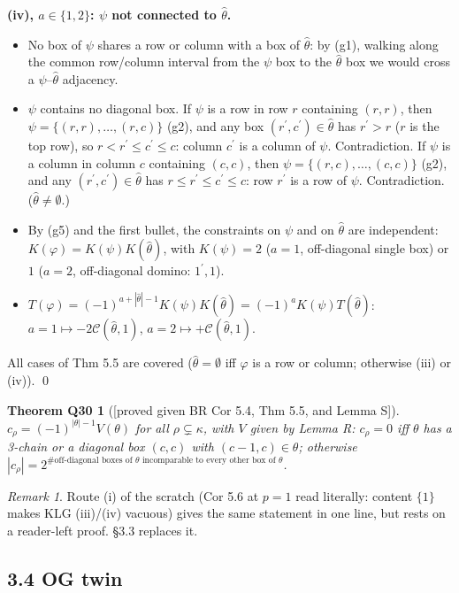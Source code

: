 \documentclass[10pt]{amsart}
\newcommand{\grade}[1]{\textsf{[#1]}}
\newcommand{\cC}{\mathcal{C}}
\newcommand{\pr}{^{\prime}}
\newtheorem*{thmQ}{Theorem Q30}
\theoremstyle{remark}
\newtheorem*{rem}{Remark}
\begin{document}
\textbf{(iv), $a\in\{1,2\}$: $\psi$ not connected to $\hat\theta$.}
\begin{itemize}
\item No box of $\psi$ shares a row or column with a box of $\hat\theta$: by (g1), walking along the common row/column
interval from the $\psi$ box to the $\hat\theta$ box we would cross a $\psi$--$\hat\theta$ adjacency.
\item $\psi$ contains no diagonal box. If $\psi$ is a row in row $r$ containing $(r,r)$, then $\psi=\{(r,r),\dots,(r,c)\}$
(g2), and any box $(r\pr,c\pr)\in\hat\theta$ has $r\pr>r$ ($r$ is the top row), so $r<r\pr\le c\pr\le c$: column $c\pr$ is a
column of $\psi$. Contradiction. If $\psi$ is a column in column $c$ containing $(c,c)$, then $\psi=\{(r,c),\dots,(c,c)\}$
(g2), and any $(r\pr,c\pr)\in\hat\theta$ has $r\le r\pr\le c\pr\le c$: row $r\pr$ is a row of $\psi$. Contradiction.
($\hat\theta\ne\emptyset$.)
\item By (g5) and the first bullet, the constraints on $\psi$ and on $\hat\theta$ are independent:
$K(\varphi)=K(\psi)K(\hat\theta)$, with $K(\psi)=2$ ($a=1$, off-diagonal single box) or $1$ ($a=2$, off-diagonal domino:
$1\pr,1$).
\item $T(\varphi)=(-1)^{a+|\hat\theta|-1}K(\psi)K(\hat\theta)=(-1)^aK(\psi)T(\hat\theta)$: $a=1\mapsto-2\cC(\hat\theta,1)$,
$a=2\mapsto+\cC(\hat\theta,1)$. \checkmark
\end{itemize}
All cases of Thm 5.5 are covered ($\hat\theta=\emptyset$ iff $\varphi$ is a row or column; otherwise (iii) or (iv)).
\qed

\begin{thmQ}[\grade{proved given BR Cor 5.4, Thm 5.5, and Lemma S}]
$c_\rho=(-1)^{|\theta|-1}V(\theta)$ for all $\rho\subsetneq\kappa$, with $V$ given by Lemma R: $c_\rho=0$ iff $\theta$ has a
3-chain or a diagonal box $(c,c)$ with $(c-1,c)\in\theta$; otherwise $|c_\rho|=2^{\#\text{off-diagonal boxes of }\theta
\text{ incomparable to every other box of }\theta}$.
\end{thmQ}

\begin{rem}
Route (i) of the scratch (Cor 5.6 at $p=1$ read literally: content $\{1\}$ makes KLG (iii)/(iv) vacuous) gives the same
statement in one line, but rests on a reader-left proof. \S3.3 replaces it.
\end{rem}

\subsection*{3.4 OG twin}
\end{document}
